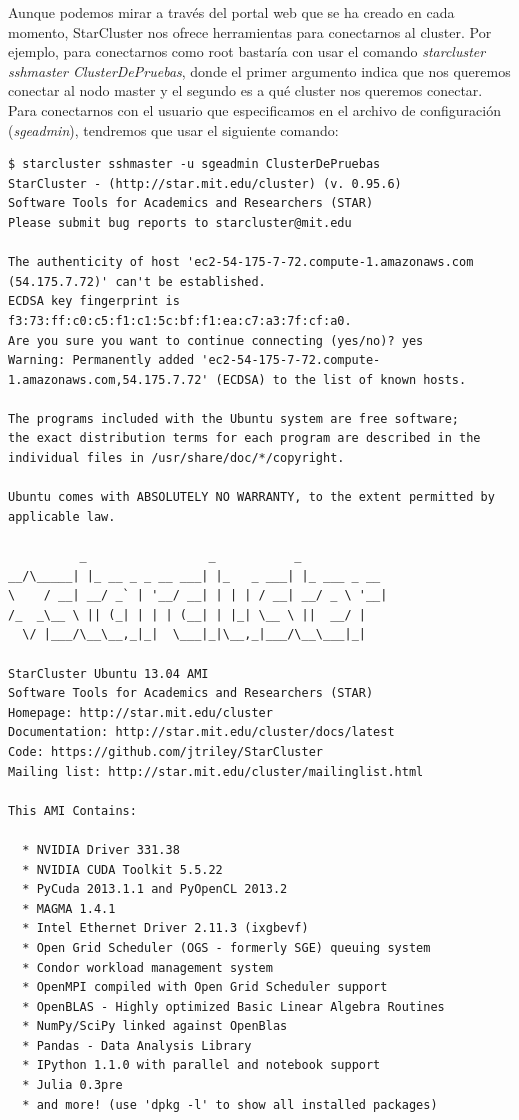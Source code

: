 \documentclass{article}
\begin{document}
	Aunque podemos mirar a través del portal web que se ha creado en cada momento, StarCluster nos ofrece herramientas para conectarnos al cluster. Por ejemplo, para conectarnos como root bastaría con usar el comando \emph{starcluster sshmaster ClusterDePruebas}, donde el primer argumento indica que nos queremos conectar al nodo master y el segundo es a qué cluster nos queremos conectar. Para conectarnos con el usuario que especificamos en el archivo de configuración (\emph{sgeadmin}), tendremos que usar el siguiente comando:
\begin{lstlisting}[style=miniBash]
$ starcluster sshmaster -u sgeadmin ClusterDePruebas
StarCluster - (http://star.mit.edu/cluster) (v. 0.95.6)
Software Tools for Academics and Researchers (STAR)
Please submit bug reports to starcluster@mit.edu

The authenticity of host 'ec2-54-175-7-72.compute-1.amazonaws.com (54.175.7.72)' can't be established.
ECDSA key fingerprint is f3:73:ff:c0:c5:f1:c1:5c:bf:f1:ea:c7:a3:7f:cf:a0.
Are you sure you want to continue connecting (yes/no)? yes
Warning: Permanently added 'ec2-54-175-7-72.compute-1.amazonaws.com,54.175.7.72' (ECDSA) to the list of known hosts.

The programs included with the Ubuntu system are free software;
the exact distribution terms for each program are described in the
individual files in /usr/share/doc/*/copyright.

Ubuntu comes with ABSOLUTELY NO WARRANTY, to the extent permitted by
applicable law.

          _                 _           _
__/\_____| |_ __ _ _ __ ___| |_   _ ___| |_ ___ _ __
\    / __| __/ _` | '__/ __| | | | / __| __/ _ \ '__|
/_  _\__ \ || (_| | | | (__| | |_| \__ \ ||  __/ |
  \/ |___/\__\__,_|_|  \___|_|\__,_|___/\__\___|_|

StarCluster Ubuntu 13.04 AMI
Software Tools for Academics and Researchers (STAR)
Homepage: http://star.mit.edu/cluster
Documentation: http://star.mit.edu/cluster/docs/latest
Code: https://github.com/jtriley/StarCluster
Mailing list: http://star.mit.edu/cluster/mailinglist.html

This AMI Contains:

  * NVIDIA Driver 331.38
  * NVIDIA CUDA Toolkit 5.5.22
  * PyCuda 2013.1.1 and PyOpenCL 2013.2
  * MAGMA 1.4.1
  * Intel Ethernet Driver 2.11.3 (ixgbevf)
  * Open Grid Scheduler (OGS - formerly SGE) queuing system
  * Condor workload management system
  * OpenMPI compiled with Open Grid Scheduler support
  * OpenBLAS - Highly optimized Basic Linear Algebra Routines
  * NumPy/SciPy linked against OpenBlas
  * Pandas - Data Analysis Library
  * IPython 1.1.0 with parallel and notebook support
  * Julia 0.3pre
  * and more! (use 'dpkg -l' to show all installed packages)


\end{lstlisting}
\end{document}
